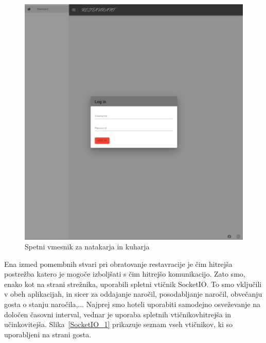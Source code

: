 \documentclass[a4paper, 12pt]{book}
\begin{document}
\begin{figure}[!htb]
\begin{center}
\includegraphics[width=12cm]{natakar-gost_1.jpg}
\end{center}
\caption{Spetni vmesnik za natakarja in kuharja}
\label{NatakarGost}
\end{figure}


Ena izmed pomembnih stvari pri obratovanje restavracije je čim hitrejša postrežba katero je mogoče izboljšati s čim hitrejšo komunikacijo. Zato smo, enako kot na strani strežnika, uporabili spletni vtičnik SocketIO. To smo vključili v obeh aplikacijah, in sicer za oddajanje naročil, posodabljanje naročil, obvečanju gosta o stanju naročila,... Najprej smo hoteli uporabiti samodejno osveževanje na določen časovni interval, vednar je uporaba spletnih vtičnikovhitrejša in učinkovitejša. Slika~\ref{SocketIO_1} prikazuje seznam vseh vtičnikov, ki so uporabljeni na strani gosta.
\end{document}
